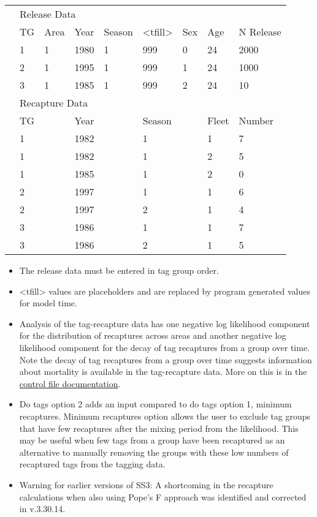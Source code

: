 \begin{center}
\begin{longtable}{p{1.1cm} p{1.1cm} p{1.1cm} p{1.1cm} p{1.1cm} p{1.1cm} p{1.1cm} p{1.1cm} p{3cm}}
		 \hline
		 & \multicolumn{8}{l}{Release Data} \Tstrut\\ 
		 & TG & Area & Year & Season & <tfill> & Sex & Age & N Release \Bstrut\\ 
		 \hline
		 & 1 & 1 & 1980 & 1 & 999 & 0 & 24 & 2000 \Tstrut\\
		 & 2 & 1 & 1995 & 1 & 999 & 1 & 24 & 1000 \\
		 & 3 & 1 & 1985 & 1 & 999 & 2 & 24 & 10 \Bstrut\\
		 \hline
		 & \multicolumn{8}{l}{Recapture Data} \Tstrut\\
		 & TG &  & Year &  & Season &  & Fleet & Number \Bstrut\\ 
		 \pagebreak
		 & 1 & & 1982 & & 1 & & 1 & 7 \Tstrut\\
		 & 1 & & 1982 & & 1 & & 2 & 5 \\
		 & 1 & & 1985 & & 1 & & 2 & 0 \\
		 & 2 & & 1997 & & 1 & & 1 & 6 \\
		 & 2 & & 1997 & & 2 & & 1 & 4 \\
		 & 3 & & 1986 & & 1 & & 1 & 7 \\
		 & 3 & & 1986 & & 2 & & 1 & 5 \Bstrut\\
		 \hline
	\end{longtable}
	\leavevmode\tagmcend\tagstructend\par
\end{center}

	\begin{itemize}
		\item The release data must be entered in tag group order.
		\item <tfill> values are placeholders and are replaced by program generated values for model time.
		\item Analysis of the tag-recapture data has one negative log likelihood component for the distribution of recaptures across areas and another negative log likelihood component for the decay of tag recaptures from a group over time. Note the decay of tag recaptures from a group over time suggests information about mortality is available in the tag-recapture data. More on this is in the \hyperlink{tagrecapture}{control file documentation}.
		\item  Do tags option 2 adds an input compared to do tags option 1, minimum recaptures. Minimum recaptures option allows the user to exclude tag groups that have few recaptures after the mixing period from the likelihood. This may be useful when few tags from a group have been recaptured as an alternative to manually removing the groups with these low numbers of recaptured tags from the tagging data.
		\item Warning for earlier versions of SS3: A shortcoming in the recapture calculations when also using Pope's F approach was identified and corrected in v.3.30.14.
	\end{itemize}

